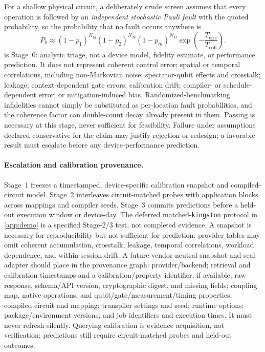 For a shallow physical circuit, a deliberately crude screen assumes that every operation is followed by an \emph{independent stochastic Pauli fault} with the quoted probability, so the probability that no fault occurs anywhere is
\begin{equation}
P_{0}\approx
(1-p_{1})^{N_{1q}}
(1-p_{2})^{N_{2q}}
(1-p_m)^{N_M}
\exp\!\left(-\frac{T_{\mathrm{circ}}}{T_{\mathrm{coh}}}\right).
\label{eq:nisq-screen}
\end{equation}
 is Stage~0: analytic triage, not a device model, fidelity estimate, or performance prediction. It does not represent coherent control error; spatial or temporal correlations, including non-Markovian noise; spectator-qubit effects and crosstalk; leakage; context-dependent gate errors; calibration drift; compiler- or schedule-dependent error; or mitigation-induced bias. Randomized-benchmarking infidelities cannot simply be substituted as per-location fault probabilities, and the coherence factor can double-count decay already present in them. Passing is necessary at this stage, never sufficient for feasibility. Failure under assumptions declared conservative for the claim may justify rejection or redesign; a favorable result must escalate before any device-performance prediction.

\paragraph{Escalation and calibration provenance.} Stage~1 freezes a timestamped, device-specific calibration snapshot and compiled-circuit model. Stage~2 interleaves circuit-matched probes with application blocks across mappings and compiler seeds. Stage~3 commits predictions before a held-out execution window or device-day. The deferred matched-\texttt{kingston} protocol in \cref{app:demo} is a specified Stage-2/3 test, not completed evidence. A snapshot is necessary for reproducibility but not sufficient for prediction: provider tables may omit coherent accumulation, crosstalk, leakage, temporal correlations, workload dependence, and within-session drift. A future vendor-neutral snapshot-and-seal adapter should place in the provenance graph: provider/backend; retrieval and calibration timestamps and a calibration/property identifier, if available; raw response, schema/API version, cryptographic digest, and missing fields; coupling map, native operations, and qubit/gate/measurement/timing properties; compiled circuit and mapping; transpiler settings and seed; runtime options; package/environment versions; and job identifiers and execution times. It must never refresh silently. Querying calibration is evidence acquisition, not verification; predictions still require circuit-matched probes and held-out outcomes.

